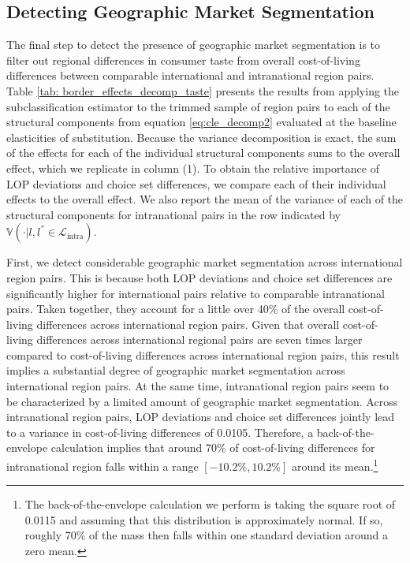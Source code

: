 \subsection{Detecting Geographic Market Segmentation}  
The final step to detect the presence of geographic market segmentation is to filter out regional differences in consumer taste from overall cost-of-living differences between comparable international and intranational region pairs. Table \ref{tab: border_effects_decomp_taste} presents the results from applying the subclassification estimator to the trimmed sample of region pairs to each of the structural components from equation \ref{eq:cle_decomp2} evaluated at the baseline elasticities of substitution. Because the variance decomposition is exact, the sum of the effects for each of the individual structural components sums to the overall effect, which we replicate in column (1). To obtain the relative importance of LOP deviations and choice set differences, we compare each of their individual effects to the overall effect. We also report the mean of the variance of each of the structural components for intranational pairs in the row indicated by $\mathbb{V}\left(\cdot|l,l^{''} \in \mathcal{L}_{\text{intra}} \right)$.

First, we detect considerable geographic market segmentation across international region pairs. This is because both LOP deviations and choice set differences are significantly higher for international pairs relative to comparable intranational pairs. Taken together, they account for a little over 40\% of the overall cost-of-living differences across international region pairs. Given that overall cost-of-living differences across international regional pairs are seven times larger compared to cost-of-living differences across international region pairs, this result implies a substantial degree of geographic market segmentation across international region pairs. At the same time, intranational region pairs seem to be characterized by a limited amount of geographic market segmentation. Across intranational region pairs, LOP deviations and choice set differences jointly lead to a variance in cost-of-living differences of 0.0105. Therefore, a back-of-the-envelope calculation implies that around 70\% of cost-of-living differences for intranational region falls within a range $[-10.2\%,10.2\%]$ around its mean.\footnote{The back-of-the-envelope calculation we perform is taking the square root of 0.0115 and assuming that this distribution is approximately normal. If so, roughly 70\% of the mass then falls within one standard deviation around a zero mean.}

